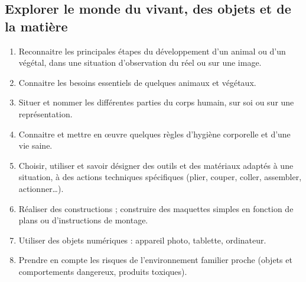 \subsection{Explorer le monde du vivant, des objets et de la matière}
\begin{enumerate}
\item Reconnaitre les principales étapes du développement d'un animal ou d'un végétal, dans une situation d’observation du réel ou sur une image.
\item Connaitre les besoins essentiels de quelques animaux et végétaux.
\item Situer et nommer les différentes parties du corps humain, sur soi ou sur une représentation.
\item Connaitre et mettre en œuvre quelques règles d'hygiène corporelle et d’une vie saine.
\item Choisir, utiliser et savoir désigner des outils et des matériaux adaptés à une situation, à des actions techniques spécifiques (plier, couper, coller, assembler, actionner\dots).
\item Réaliser des constructions ; construire des maquettes simples en fonction de plans ou d’instructions de montage. 
\item Utiliser des objets numériques : appareil photo, tablette, ordinateur.
\item Prendre en compte les risques de l'environnement familier proche (objets et comportements dangereux, produits toxiques).
\end{enumerate}